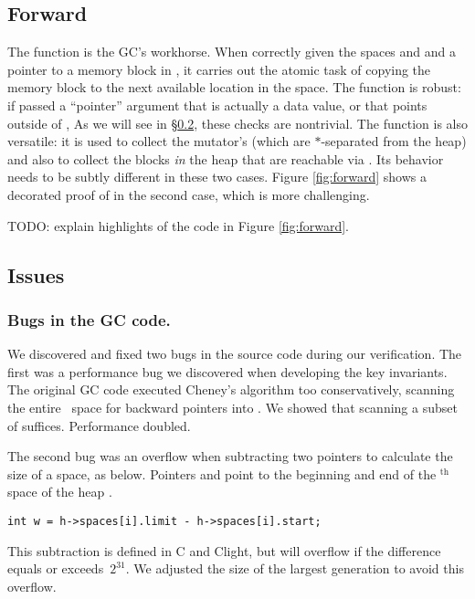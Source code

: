 \subsection{Forward}
\label{sec:gcforward}
The function  is the GC's workhorse.
When correctly given the spaces  and  and a pointer
 to a memory block in ,
it carries out the atomic task of copying the memory block to the next
available location in the  space.
The function is robust: if passed a ``pointer'' argument
that is actually a data value, or that points outside of
, 
As we will see in \S\ref{sec:gcissues}, these checks are nontrivial.
The function is also versatile: it is used to collect the
mutator's  (which are $*$-separated from the heap)
and also to collect the blocks \emph{in} the heap that are reachable via
. Its behavior needs to be subtly different in these
two cases.
Figure \ref{fig:forward} shows a decorated proof of 
in the second case, which is more challenging.

TODO: explain highlights of the code in Figure \ref{fig:forward}.



\subsection{Issues} \label{sec:gcissues}

\subsubsection*{Bugs in the GC code.}
We discovered and fixed two bugs in the source code during our verification.
The first was a performance bug we discovered when developing the key invariants.
The original GC code executed Cheney's algorithm too conservatively,
scanning the entire~ space for backward pointers into . We
showed that scanning a subset of  suffices.  Performance doubled.

The second bug was an overflow when subtracting two pointers
to calculate the size of a space, as below. Pointers  and 
point to the beginning and end of the $^{\text{th}}$ space of the
heap .
\begin{lstlisting}[numbers=none]
  int w = h->spaces[i].limit - h->spaces[i].start;
\end{lstlisting}
This subtraction is defined in C and Clight, but
will overflow if the difference equals
or exceeds~$2^{31}$. We adjusted the size of the largest generation to avoid this overflow.


